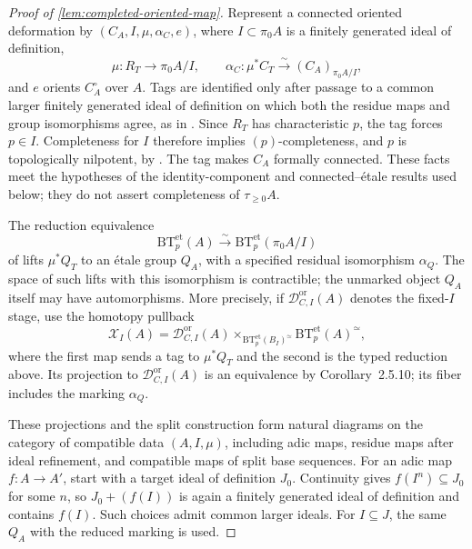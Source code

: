 \documentclass[11pt]{article}
\numberwithin{equation}{section}
\theoremstyle{definition}
\theoremstyle{remark}
\begin{document}
\begin{proof}[Proof of \cref{lem:completed-oriented-map}]
Represent a connected oriented deformation by
\((C_A,I,\mu,\alpha_C,e)\), where \(I\subset\pi_0A\) is a finitely
generated ideal of definition,
\[
 \mu:R_T\longrightarrow\pi_0A/I,\qquad
 \alpha_C:\mu^*C_T\xrightarrow{\sim}(C_A)_{\pi_0A/I},
\]
and \(e\) orients \(C_A^\circ\) over \(A\). Tags are identified only after
passage to a common larger finitely generated ideal of definition on
which both the residue maps and group isomorphisms agree, as in
\cite[Definitions~3.1.1 and~3.1.4]{LurieEllipticII2018}.
Since \(R_T\) has characteristic \(p\), the tag forces \(p\in I\).
Completeness for \(I\) therefore implies \((p)\)-completeness, and \(p\)
is topologically nilpotent, by
\cite[Remarks~0.0.10--0.0.12]{LurieEllipticII2018}. The tag makes \(C_A\)
formally connected. These facts meet the hypotheses of the
identity-component and connected--étale results used below; they do not
assert completeness of \(\tau_{\geq0}A\).

The reduction equivalence
\[
 \mathrm{BT}^{\mathrm{et}}_p(A)\xrightarrow{\sim}
 \mathrm{BT}^{\mathrm{et}}_p(\pi_0A/I)
\]
of \cite[Corollary~2.5.10]{LurieEllipticII2018} lifts \(\mu^*Q_T\) to an
étale group \(Q_A\), with a specified residual isomorphism \(\alpha_Q\).
The space of such lifts with this isomorphism is contractible; the
unmarked object \(Q_A\) itself may have automorphisms. More precisely, if
\(\mathscr D_{C,I}^{\mathrm{or}}(A)\) denotes the fixed-\(I\) stage, use
the homotopy pullback
\[
 \mathscr X_I(A)=
 \mathscr D_{C,I}^{\mathrm{or}}(A)
 \mathop{\times}_{\mathrm{BT}^{\mathrm{et}}_p(B_I)^\simeq}
 \mathrm{BT}^{\mathrm{et}}_p(A)^\simeq ,
\]
where the first map sends a tag to \(\mu^*Q_T\) and the second is the typed
reduction above. Its projection to
\(\mathscr D_{C,I}^{\mathrm{or}}(A)\) is an equivalence by
Corollary~2.5.10; its fiber includes the marking \(\alpha_Q\).

These projections and the split construction form natural diagrams on
the category of compatible data \((A,I,\mu)\), including adic maps,
residue maps after ideal refinement, and compatible maps of split base
sequences. For an adic map \(f:A\to A'\), start with a target ideal of
definition \(J_0\). Continuity gives \(f(I^n)\subseteq J_0\) for some
\(n\), so \(J_0+(f(I))\) is again a finitely generated ideal of definition
and contains \(f(I)\). Such choices admit common larger ideals. For
\(I\subseteq J\), the same \(Q_A\) with the reduced marking is used.


\end{proof}
\end{document}
